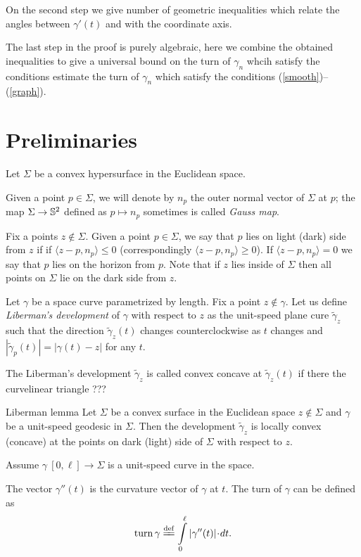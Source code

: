 \documentclass[a4paper,10pt]{amsart}
\begin{document}
On the second step we give number of geometric inequalities which relate the angles between $\gamma'(t)$ and with the coordinate axis.

The last step in the proof is purely algebraic, 
here we combine the obtained inequalities to give a universal bound on the turn of $\gamma_n$ whcih satisfy the conditions  estimate the turn of $\gamma_n$ which satisfy the conditions (\ref{smooth})--(\ref{graph}).


\section{Preliminaries}

Let $\Sigma$ be a convex hypersurface in the Euclidean space.

Given a point $p\in \Sigma$, we will denote by $n_p$ the outer normal vector of $\Sigma$ at $p$;
the map $\Sigma\to\mathbb{S}^2$ defined as $p\mapsto n_p$ sometimes is called \emph{Gauss map}.

Fix a points $z\notin\Sigma$.
Given a point $p\in \Sigma$,
we say that $p$ lies on light (dark) side from $z$ if 
if $\langle z-p,n_p\rangle\le 0$ (correspondingly $\langle z-p,n_p\rangle\ge 0$).
If $\langle z-p,n_p\rangle= 0$ we say that $p$ lies on the horizon
from $p$.
Note that if $z$ lies inside of $\Sigma$ then all points on $\Sigma$ lie on the dark side from $z$.

Let $\gamma$ be a space curve 
parametrized by length.
Fix a point $z\notin\gamma$. 
Let us define \emph{Liberman's development} of $\gamma$ with respect to $z$ as the unit-speed plane cure $\tilde\gamma_z$ such that the direction $\tilde\gamma_z(t)$
changes counterclockwise as $t$ changes
and
$|\tilde\gamma_p(t)|=|\gamma(t)-z|$ for any $t$.

The Liberman's development $\tilde\gamma_z$ is called convex concave at $\tilde\gamma_z(t)$ if there the curvelinear triangle ??? 


\begin{thm}{Liberman lemma}\label{lem:liberman}
Let $\Sigma$ be a convex surface in the Euclidean space 
$z\not\in\Sigma$ and $\gamma$ be a unit-speed geodesic in $\Sigma$.
Then the development $\tilde\gamma_z$ is locally convex (concave) 
at the points on dark (light) side of $\Sigma$ with respect to $z$.
\end{thm}

Assume $\gamma\:[0,\ell]\to \Sigma$ is a unit-speed curve in the space.

The vector $\gamma''(t)$ is the curvature vector of $\gamma$ at $t$.
The turn of $\gamma$ can be defined as 
\[\turn\gamma\df\int\limits_0^\ell|\gamma''(t)|\cdot dt.\]
\end{document}

